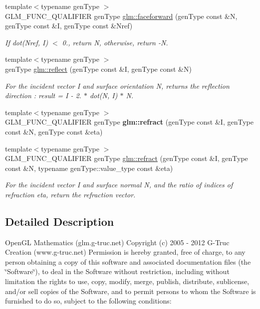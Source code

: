\begin{DoxyCompactItemize}
\item 
{\footnotesize template$<$typename gen\-Type $>$ }\\G\-L\-M\-\_\-\-F\-U\-N\-C\-\_\-\-Q\-U\-A\-L\-I\-F\-I\-E\-R gen\-Type \hyperlink{group__core__func__geometric_ga855fc5fd7779df1683482564956c6764}{glm\-::faceforward} (gen\-Type const \&N, gen\-Type const \&I, gen\-Type const \&Nref)
\begin{DoxyCompactList}\small\item\em If dot(\-Nref, I) $<$ 0., return N, otherwise, return -\/\-N. \end{DoxyCompactList}\item 
{\footnotesize template$<$typename gen\-Type $>$ }\\gen\-Type \hyperlink{group__core__func__geometric_gabe1fa0bef5f854242eb70ce56e5a7d03}{glm\-::reflect} (gen\-Type const \&I, gen\-Type const \&N)
\begin{DoxyCompactList}\small\item\em For the incident vector I and surface orientation N, returns the reflection direction \-: result = I -\/ 2. $\ast$ dot(\-N, I) $\ast$ N. \end{DoxyCompactList}\item 
\hypertarget{namespaceglm_a9aa448ae8257316d0bd2a7ba6e9f201d}{{\footnotesize template$<$typename gen\-Type $>$ }\\G\-L\-M\-\_\-\-F\-U\-N\-C\-\_\-\-Q\-U\-A\-L\-I\-F\-I\-E\-R gen\-Type {\bfseries glm\-::refract} (gen\-Type const \&I, gen\-Type const \&N, gen\-Type const \&eta)}\label{namespaceglm_a9aa448ae8257316d0bd2a7ba6e9f201d}

\item 
{\footnotesize template$<$typename gen\-Type $>$ }\\G\-L\-M\-\_\-\-F\-U\-N\-C\-\_\-\-Q\-U\-A\-L\-I\-F\-I\-E\-R gen\-Type \hyperlink{group__core__func__geometric_gabbb4909d3e99a7a2411cc63252afbbd8}{glm\-::refract} (gen\-Type const \&I, gen\-Type const \&N, typename gen\-Type\-::value\-\_\-type const \&eta)
\begin{DoxyCompactList}\small\item\em For the incident vector I and surface normal N, and the ratio of indices of refraction eta, return the refraction vector. \end{DoxyCompactList}\end{DoxyCompactItemize}


\subsection{Detailed Description}
Open\-G\-L Mathematics (glm.\-g-\/truc.\-net) Copyright (c) 2005 -\/ 2012 G-\/\-Truc Creation (www.\-g-\/truc.\-net) Permission is hereby granted, free of charge, to any person obtaining a copy of this software and associated documentation files (the \char`\"{}\-Software\char`\"{}), to deal in the Software without restriction, including without limitation the rights to use, copy, modify, merge, publish, distribute, sublicense, and/or sell copies of the Software, and to permit persons to whom the Software is furnished to do so, subject to the following conditions\-:

